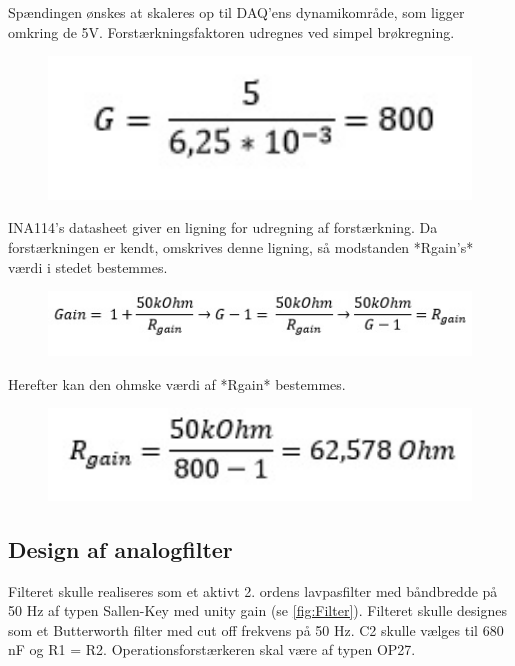 Spændingen ønskes at skaleres op til DAQ’ens dynamikområde, som ligger omkring de 5V. Forstærkningsfaktoren udregnes ved simpel brøkregning. \\

\begin{figure}[H]
	\centering
	\includegraphics[width=1\textwidth]{Figurer/ligningtilgain}
\end{figure}

INA114’s datasheet giver en ligning for udregning af forstærkning. Da forstærkningen er kendt, omskrives denne ligning, så modstanden *Rgain’s* værdi i stedet bestemmes.\\

\begin{figure}[H]
	\centering
	\includegraphics[width=1\textwidth]{Figurer/omskrivningtilgain}
\end{figure}

Herefter kan den ohmske værdi af *Rgain* bestemmes.\\

\begin{figure}[H]
	\centering
	\includegraphics[width=1\textwidth]{Figurer/udregningafgain}
\end{figure}

\subsection{Design af analogfilter}
Filteret skulle realiseres som et aktivt 2. ordens lavpasfilter med båndbredde på 50 Hz af typen Sallen-Key med unity gain (se \ref{fig:Filter}). Filteret skulle designes som et Butterworth filter med cut off frekvens på 50 Hz. C2 skulle vælges til 680 nF og R1 = R2. Operationsforstærkeren skal være af typen OP27.  

